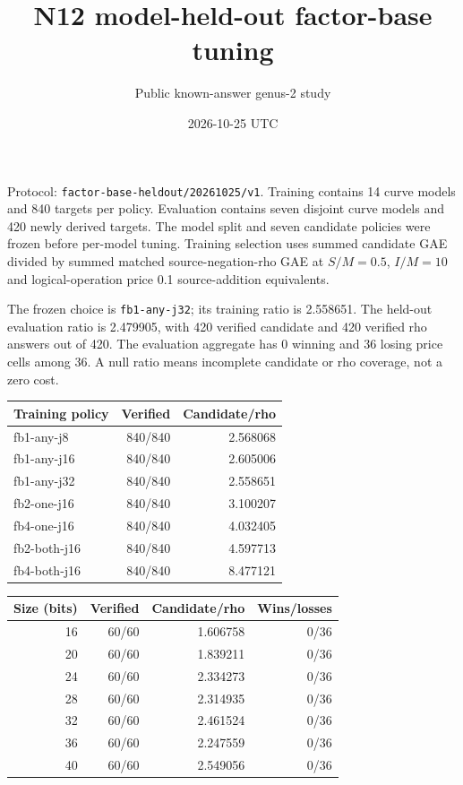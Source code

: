 \documentclass[11pt]{article}
\begin{document}
\title{N12 model-held-out factor-base tuning}
\author{Public known-answer genus-2 study}
\date{2026-10-25 UTC}
\maketitle
\noindent Protocol: \texttt{factor-base-heldout/20261025/v1}. Training contains 14 curve models and 840 targets per policy. Evaluation contains seven disjoint curve models and 420 newly derived targets. The model split and seven candidate policies were frozen before per-model tuning. Training selection uses summed candidate GAE divided by summed matched source-negation-rho GAE at $S/M=0.5$, $I/M=10$ and logical-operation price 0.1 source-addition equivalents.\par
\medskip
\noindent The frozen choice is \texttt{fb1-any-j32}; its training ratio is 2.558651. The held-out evaluation ratio is 2.479905, with 420 verified candidate and 420 verified rho answers out of 420. The evaluation aggregate has 0 winning and 36 losing price cells among 36. A null ratio means incomplete candidate or rho coverage, not a zero cost.\par
\medskip
\begin{center}
\begin{tabular}{lrr}
Training policy & Verified & Candidate/rho \\ \hline
fb1-any-j8 & 840/840 & 2.568068 \\
fb1-any-j16 & 840/840 & 2.605006 \\
fb1-any-j32 & 840/840 & 2.558651 \\
fb2-one-j16 & 840/840 & 3.100207 \\
fb4-one-j16 & 840/840 & 4.032405 \\
fb2-both-j16 & 840/840 & 4.597713 \\
fb4-both-j16 & 840/840 & 8.477121 \\
\end{tabular}
\end{center}
\begin{center}
\begin{tabular}{rrrr}
Size (bits) & Verified & Candidate/rho & Wins/losses \\ \hline
16 & 60/60 & 1.606758 & 0/36 \\
20 & 60/60 & 1.839211 & 0/36 \\
24 & 60/60 & 2.334273 & 0/36 \\
28 & 60/60 & 2.314935 & 0/36 \\
32 & 60/60 & 2.461524 & 0/36 \\
36 & 60/60 & 2.247559 & 0/36 \\
40 & 60/60 & 2.549056 & 0/36 \\
\end{tabular}
\end{center}
\end{document}
